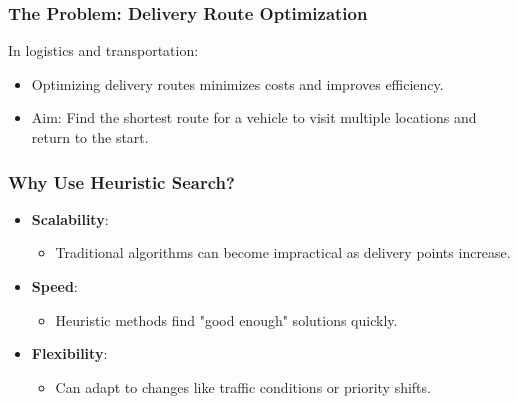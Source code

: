 \documentclass[aspectratio=169]{beamer}
\begin{document}
\begin{frame}[fragile]
    \frametitle{The Problem: Delivery Route Optimization}
    In logistics and transportation:
    \begin{itemize}
        \item Optimizing delivery routes minimizes costs and improves efficiency.
        \item Aim: Find the shortest route for a vehicle to visit multiple locations and return to the start.
    \end{itemize}
\end{frame}

\begin{frame}[fragile]
    \frametitle{Why Use Heuristic Search?}
    \begin{itemize}
        \item \textbf{Scalability}:
            \begin{itemize}
                \item Traditional algorithms can become impractical as delivery points increase.
            \end{itemize}
        \item \textbf{Speed}:
            \begin{itemize}
                \item Heuristic methods find "good enough" solutions quickly.
            \end{itemize}
        \item \textbf{Flexibility}:
            \begin{itemize}
                \item Can adapt to changes like traffic conditions or priority shifts.
            \end{itemize}
    \end{itemize}
\end{frame}
\end{document}
